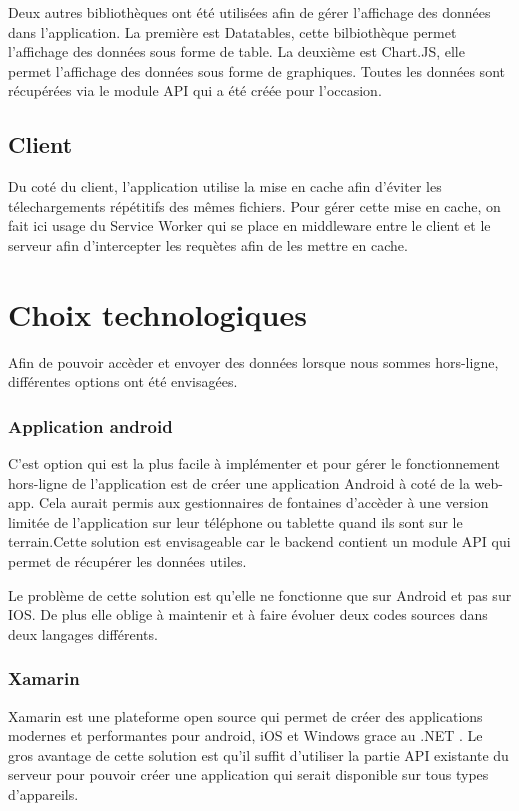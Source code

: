 \documentclass{EPL-master-thesis-covers-FR}
\begin{document}
				Deux autres bibliothèques ont été utilisées afin de gérer l'affichage des données dans l'application. La première est Datatables, cette bilbiothèque permet l'affichage des données sous forme de table. La deuxième est Chart.JS, elle permet l'affichage des données sous forme de graphiques. Toutes les données sont récupérées via le module API qui a été créée pour l'occasion.
				
			\subsection*{Client}
				Du coté du client, l'application utilise la mise en cache afin d'éviter les télechargements répétitifs des mêmes fichiers. Pour gérer cette mise en cache, on fait ici usage du Service Worker qui se place en middleware entre le client et le serveur afin d'intercepter les requètes afin de les mettre en cache.

		
		\section{Choix technologiques}
			\label{sec:choix_tech}
			Afin de pouvoir accèder et envoyer des données lorsque nous sommes hors-ligne, différentes options ont été envisagées.
			\subsubsection*{Application android}
				C'est option qui est la plus facile à implémenter et pour gérer le fonctionnement hors-ligne de l'application est de créer une application Android à coté de la web-app. Cela aurait permis aux gestionnaires de fontaines d'accèder à une version limitée de l'application sur leur téléphone ou tablette quand ils sont sur le terrain.Cette solution est envisageable car le backend contient un module API qui permet de récupérer les données utiles.
			
				Le problème de cette solution est qu'elle ne fonctionne que sur Android et pas sur IOS. De plus elle oblige à maintenir et à faire évoluer deux codes sources dans deux langages différents.
			\subsubsection*{Xamarin}
				Xamarin est une plateforme open source qui permet de créer des applications modernes et performantes pour android, iOS et Windows grace au .NET \cite{ref:xamarin}. Le gros avantage de cette solution est qu'il suffit d'utiliser la partie API existante du serveur pour pouvoir créer une application qui serait disponible sur tous types d'appareils.
			
\end{document}
